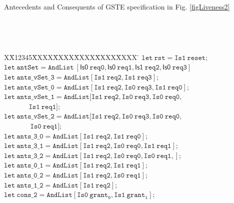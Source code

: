 \documentclass[final]{IEEEtran}
\newlength{\fminilength}
\newenvironment{fmini}[1][\linewidth]
  {\setlength{\fminilength}{#1\fboxsep-2\fboxrule}%
   \vspace{2ex}\noindent\begin{lrbox}{\fminibox}\begin{minipage}{\fminilength}%
   \mbox{ }\hfill\vspace{-2.5ex}}%
  {\end{minipage}\end{lrbox}\vspace{1ex}\hspace{0ex}%
   \framebox{\usebox{\fminibox}}}
\newenvironment{specification}
{\noindent\footnotesize\tt\begin{fmini}\begin{tabbing}X\=X12345\=XXXX\=XXXX\=XXXX\=XXXX\=XXXX
\=\+\kill} {\end{tabbing}\normalfont\end{fmini}}
\begin{document}
\vspace{2mm}
\begin{center}

\begin{table}
\caption{Antecedents and Consequents of   GSTE specification in Fig.
\ref{figLiveness2}}


\begin{specification}
$\mathtt{let\ rst = Is1\ reset;}$\\
$\mathtt{let\ antSet= AndList\ [\mathsf{Is0}\ req0, \mathsf{Is0}\
req1,\mathsf{Is1}\ req2,\mathsf{Is0}\ req3]}$ \\
$\mathtt{ let\ ants\_vSet\_3 = AndList [ Is1\ req2,Is1\
req3]; }$\\
$\mathtt{let\ ants\_vSet\_0= AndList [Is1\ req2,Is0\ req3, Is1\ req0];}$\\
$ \mathtt{let\ ants\_vSet\_1 = AndList[Is1\ req2, Is0\ req3,Is0\ req0,}$\\
$ \ \ \ \ \ \ \ \ \ \ \  \ \ \ \ \  \mathtt{Is1\  req1]};$\\
 $\mathtt{let\ ants\_vSet\_2 = AndList [Is1\ req2,Is0\ req3, Is0\ req0,}$\\
 $ \ \ \ \ \ \ \ \ \ \ \ \ \ \ \ \ \ \mathtt{ Is0\ req1 ]};$\\
$ \mathtt{let\ ants\_3\_0=AndList [Is1\ req2,Is1\ req0]};$\\
$ \mathtt{let\ ants\_3\_1=AndList [Is1\ req2,Is0\ req0, Is1\ req1];}$ \\
$\mathtt{let\ ants\_3\_2=AndList [Is1\ req2,Is0\ req0, Is0\ req1,
 ];}$ \\
$ \mathtt{let\ ants\_0\_1= AndList [Is1\ req2,Is1\ req1];} $\\
 $\mathtt{let\ ants\_0\_2= AndList [Is1\ req2,Is0\ req1 ]};$\\

$ \mathtt{let\ ants\_1\_2= AndList [Is1\ req2 ]};$\\
 $\mathtt{let\ cons\_ 2=AndList [Is0\ grant_0, Is1\ grant_1];}$ \\
\end{specification}

\end{table}
\end{center}
\end{document}
